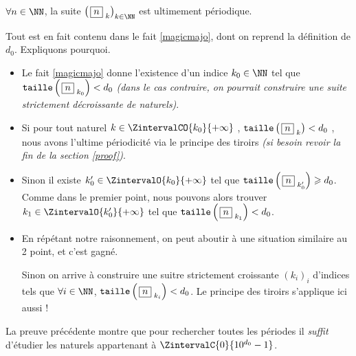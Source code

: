 \medskip

\begin{fact}\label{beautifulproof}
	$\forall n \in \NN$, la suite $\left( \, \sqseq{n}{k} \right)_{k \in \NN}$ est ultimement périodique.
\end{fact}

\begin{proof*}
	Tout est en fait contenu dans le fait \ref{magicmajo}, dont on reprend la définition de $d_0$. Expliquons pourquoi.
	\begin{itemize}[label = \textbullet]
		\item Le fait \ref{magicmajo} donne l'existence d'un indice $k_0 \in \NN$ tel que $\operatorname{\text{\normalfont\texttt{taille}}}\left( \, \fbox{$n$}_{\,\,k_0} \right) < d_0$ \emph{(dans le cas contraire, on pourrait construire une suite strictement décroissante de naturels)}.

		\item Si pour tout naturel $k \in \ZintervalCO{k_0}{+\infty}$ , $\operatorname{\text{\normalfont\texttt{taille}}}\left( \, \fbox{$n$}_{\,\,k} \right) < d_0$ , nous avons l'ultime périodicité via le principe des tiroirs \emph{(si besoin revoir la fin de la section \ref{proof})}.

		\item Sinon il existe $k^\prime_0 \in \ZintervalO{k_0}{+\infty}$ tel que $\operatorname{\text{\normalfont\texttt{taille}}}\left( \, \fbox{$n$}_{\,\,k^\prime_0} \right) \geqslant d_0$. Comme dans le premier point, nous pouvons alors trouver $k_1 \in \ZintervalO{k^\prime_0}{+\infty}$ tel que $\operatorname{\text{\normalfont\texttt{taille}}}\left( \, \fbox{$n$}_{\,\,k_1} \right) < d_0$.
		
		\item En répétant notre raisonnement,
		on peut aboutir à une situation similaire au 2\ieme{} point, et c'est gagné. 
		
		\noindent
		Sinon on arrive à construire une suitre strictement croissante $\left( k_i \right)_i$ d'indices tels que $\forall i \in \NN$, $\operatorname{\text{\normalfont\texttt{taille}}}\left( \, \fbox{$n$}_{\,\,k_i} \right) < d_0$. Le principe des tiroirs s'applique ici aussi !
	\end{itemize}
\end{proof*}



\medskip

\begin{remark}
	La preuve précédente montre que pour rechercher toutes les périodes il \emph{\og suffit \fg} d'étudier les naturels appartenant à $\ZintervalC{0}{10^{d_0} - 1}$.
\end{remark}
